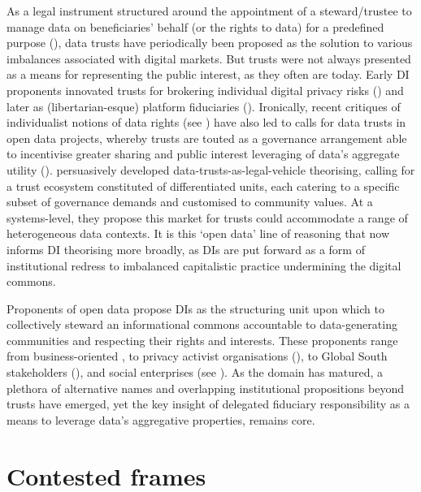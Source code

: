 As a legal instrument structured around the appointment of a steward/trustee to manage data on beneficiaries’ behalf (or the rights to data) for a predefined purpose (\cite{ohara2020DataTrusts}), data trusts have periodically been proposed as the solution to various imbalances associated with digital markets. But trusts were not always presented as a means for representing the public interest, as they often are today. Early DI proponents innovated trusts for brokering individual digital privacy risks (\cite{edwards2004ProblemPrivacyModest}) and later as (libertarian-esque) platform fiduciaries (\cite{BalkinFiduciary}). Ironically, recent critiques of individualist notions of data rights (see \textcite{viljoen2021RelationalTheoryData}) have also led to calls for data trusts in open data projects, whereby trusts are touted as a governance arrangement able to incentivise greater sharing and public interest leveraging of data’s aggregate utility (\cite{2021EconomicImpactTrust}). \textcite{delacroix2019BottomupDataTrusts} persuasively developed data-trusts-as-legal-vehicle theorising, calling for a trust ecosystem constituted of differentiated units, each catering to a specific subset of governance demands and customised to community values. At a systems-level, they propose this market for trusts could accommodate a range of heterogeneous data contexts. It is this `open data' line of reasoning that now informs DI theorising more broadly, as DIs are put forward as a form of institutional redress to imbalanced capitalistic practice undermining the digital commons.

Proponents of open data propose DIs as the structuring unit upon which to collectively steward an informational commons accountable to data-generating communities and respecting their rights and interests. These proponents range from business-oriented \textcite{zarkadakis2020DataTrustsCould}, to privacy activist organisations (\cite{DataTrustsInitiative}), to Global South stakeholders (\textcite{borokini2021ExploringthefutureofdatagovernaceinAfricaDataStewardship}), and social enterprises (see \cite{CasesDataCollaboratives}). As the domain has matured, a plethora of alternative names and overlapping institutional propositions beyond trusts have emerged, yet the key insight of delegated fiduciary responsibility as a means to leverage data’s aggregative properties, remains core.

\section*{Contested frames}

